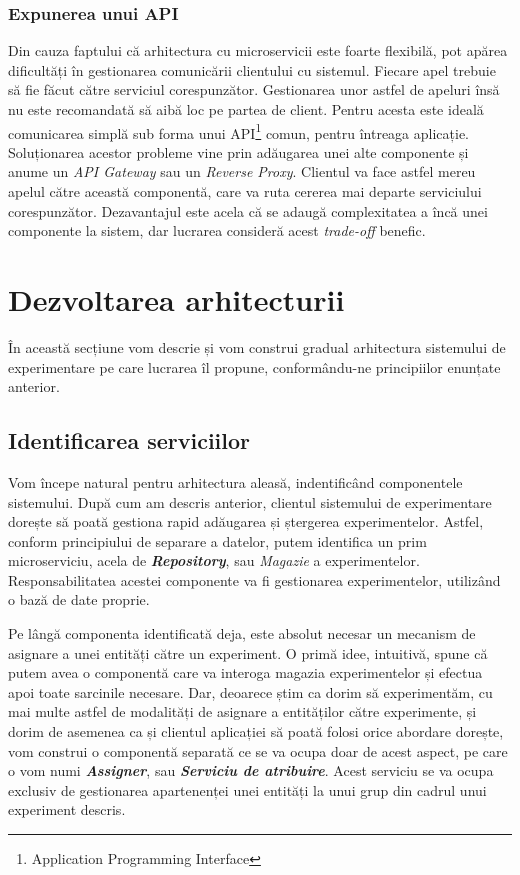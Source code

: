 \subsubsection{Expunerea unui API}

Din cauza faptului că arhitectura cu microservicii este foarte flexibilă, pot apărea dificultăți în gestionarea comunicării clientului cu sistemul. Fiecare apel trebuie să fie făcut către serviciul corespunzător. Gestionarea unor astfel de apeluri însă nu este recomandată să aibă loc pe partea de client.  Pentru acesta este ideală comunicarea simplă sub forma unui API\footnote{Application Programming Interface} comun, pentru întreaga aplicație. Soluționarea acestor probleme vine prin adăugarea unei alte componente și anume un \textit{API Gateway} sau un \textit{Reverse Proxy}. Clientul va face astfel mereu apelul către această componentă, care va ruta cererea mai departe serviciului corespunzător. Dezavantajul este acela că se adaugă complexitatea a încă unei componente la sistem, dar lucrarea consideră acest \textit{trade-off} benefic. 

\section{Dezvoltarea arhitecturii}

În această secțiune vom descrie și vom construi gradual arhitectura sistemului de experimentare pe care lucrarea îl propune, conformându-ne principiilor enunțate anterior.

\subsection{Identificarea serviciilor}

Vom începe natural pentru arhitectura aleasă, indentificând componentele sistemului. După cum am descris anterior, clientul sistemului de experimentare dorește să poată gestiona rapid adăugarea și ștergerea experimentelor. Astfel, conform principiului de separare a datelor, putem identifica un prim microserviciu, acela de \textbf{\textit{Repository}}, sau \textit{Magazie} a experimentelor. Responsabilitatea acestei componente va fi gestionarea experimentelor, utilizând o bază de date proprie.

Pe lângă componenta identificată deja, este absolut necesar un mecanism de asignare a unei entități către un experiment. O primă idee, intuitivă, spune că putem avea o componentă care va interoga magazia experimentelor și efectua apoi toate sarcinile necesare. Dar, deoarece știm ca dorim să experimentăm, cu mai multe astfel de modalități de asignare a entităților către experimente, și dorim de asemenea ca și clientul aplicației să poată folosi orice abordare dorește, vom construi o componentă separată ce se va ocupa doar de acest aspect, pe care o vom numi \textit{\textbf{Assigner}}, sau \textbf{\textit{Serviciu de atribuire}}. Acest serviciu se va ocupa exclusiv de gestionarea apartenenței unei entități la unui grup din cadrul unui experiment descris.


